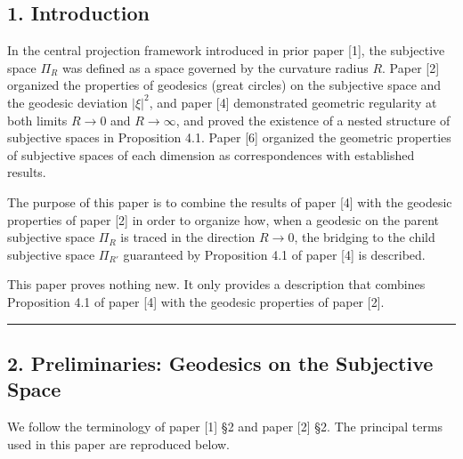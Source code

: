 \documentclass[a4paper,11pt]{article}
\theoremstyle{definition}
\begin{document}
\subsection{1. Introduction}\label{introduction}

In the central projection framework introduced in prior paper {[}1{]}, the subjective space \(\Pi_R\) was defined as a space governed by the curvature radius \(R\). Paper {[}2{]} organized the properties of geodesics (great circles) on the subjective space and the geodesic deviation \(|\xi|^2\), and paper {[}4{]} demonstrated geometric regularity at both limits \(R \to 0\) and \(R \to \infty\), and proved the existence of a nested structure of subjective spaces in Proposition 4.1. Paper {[}6{]} organized the geometric properties of subjective spaces of each dimension as correspondences with established results.

The purpose of this paper is to combine the results of paper {[}4{]} with the geodesic properties of paper {[}2{]} in order to organize how, when a geodesic on the parent subjective space \(\Pi_R\) is traced in the direction \(R \to 0\), the bridging to the child subjective space \(\Pi_{R'}\) guaranteed by Proposition 4.1 of paper {[}4{]} is described.

This paper proves nothing new. It only provides a description that combines Proposition 4.1 of paper {[}4{]} with the geodesic properties of paper {[}2{]}.

\begin{center}\rule{0.5\linewidth}{0.5pt}\end{center}

\subsection{2. Preliminaries: Geodesics on the Subjective Space}\label{preliminaries-geodesics-on-the-subjective-space}

We follow the terminology of paper {[}1{]} §2 and paper {[}2{]} §2. The principal terms used in this paper are reproduced below.
\end{document}
